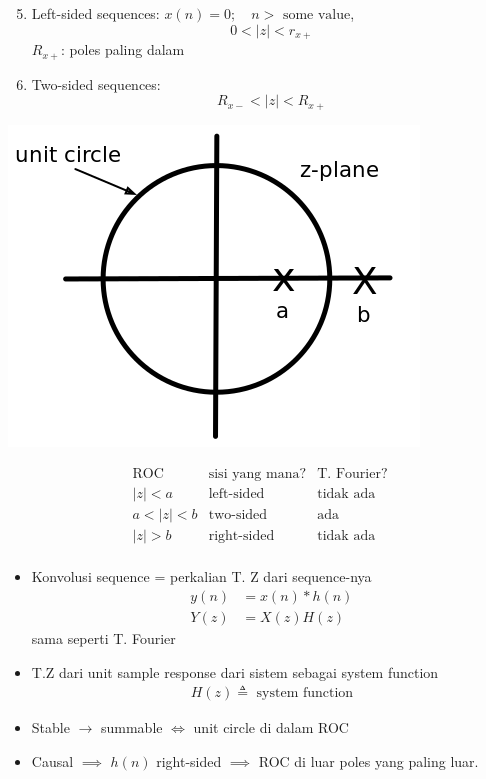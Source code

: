 \documentclass[pdflatex,compress,mathserif]{beamer}
\begin{document}
\begin{frame}
	\begin{enumerate}
		\setcounter{enumi}{4}
		\item Left-sided sequences: $ x(n) = 0; \quad n>\text{ some value} $, \[ 0< |z| < r_{x+} \] $ R_{x+} $: poles paling dalam
		\item Two-sided sequences: \[ R_{x-} < |z| < R_{x+} \]
	\end{enumerate}
\end{frame}

\begin{frame}
	\begin{center}
		\includegraphics[width=0.5\linewidth]{img/img03}
	\end{center}
	\[ 
		\begin{matrix}
		\text{ROC} & \text{sisi yang mana?} & \text{T. Fourier?} \\
		|z| < a & \text{left-sided} & \text{tidak ada}\\
		a < |z| < b & \text{two-sided} & \text{ada}\\
		|z| > b & \text{right-sided} & \text{tidak ada}\\
		\end{matrix}
	\]
\end{frame}

\begin{frame}
	\begin{itemize}
		\item Konvolusi sequence = perkalian T. Z dari sequence-nya
		\begin{align*}
			y(n) &= x(n) * h(n) \\
			Y(z) &= X(z)H(z)
		\end{align*}
		sama seperti T. Fourier
		\item T.Z dari unit sample response dari sistem sebagai system function
		\begin{align*}
			H(z) \triangleq \text{ system function}
		\end{align*}
		\item Stable $\rightarrow$ summable $\Leftrightarrow$ unit circle di dalam ROC
		\item Causal $ \implies $ $ h(n) $ right-sided $ \implies $ ROC di luar poles yang paling luar.
	\end{itemize}
\end{frame}
\end{document}
